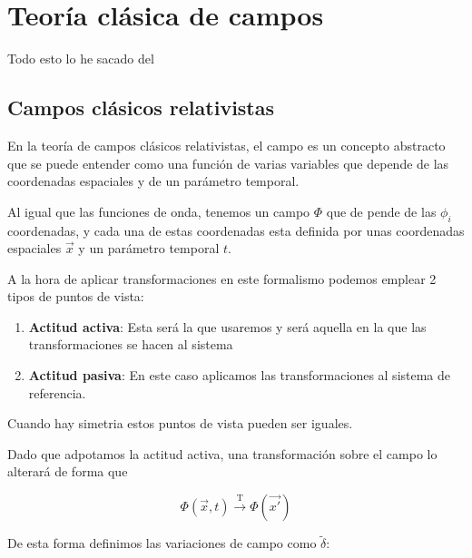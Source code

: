 \setchapterpreamble[u]{\margintoc}
\chapter{Teoría clásica de campos}

\begin{center}
  \large Todo esto lo he sacado del \cite{Dobdado}
\end{center}
\section{Campos clásicos relativistas}

En la teoría de campos clásicos relativistas, el campo es un concepto abstracto que se puede entender como una función de varias variables que depende de las coordenadas espaciales y de un parámetro temporal.

Al igual que las funciones de onda, tenemos un campo $\Phi$ que de pende de las $\phi_{i}$ coordenadas, y cada una de estas coordenadas esta definida por unas coordenadas espaciales $\vec{x}$ y un parámetro temporal $t$.

A la hora de aplicar transformaciones en este formalismo podemos emplear 2 tipos de puntos de vista:
\begin{enumerate}
  \item \textbf{Actitud activa}: Esta será la que usaremos y será aquella en la que las transformaciones se hacen al sistema 
  \item \textbf{Actitud pasiva}: En este caso aplicamos las transformaciones al sistema de referencia.
\end{enumerate}
\begin{corollary}
  Cuando hay simetria estos puntos de vista pueden ser iguales.
\end{corollary}

Dado que adpotamos la actitud activa, una transformación sobre el campo lo alterará de forma que 

\[\Phi(\vec{x},t)\xrightarrow{\text{T}} \Phi(\vec{x'})\]

De esta forma definimos las variaciones de campo como $\tilde{\delta}$:

